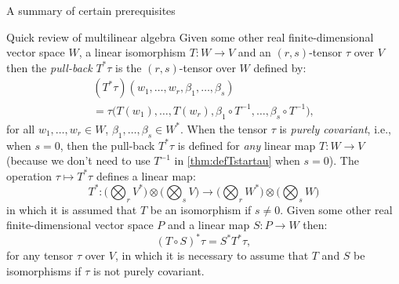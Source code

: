 \documentclass[oneside,a4paper,11pt]{amsbook}
\theoremstyle{remark}\newtheorem{exercise}{Exercise}[chapter]
\theoremstyle{plain}\newtheorem{teo}{Theorem}[section]
\theoremstyle{plain}\newtheorem{lem}[teo]{Lemma}
\theoremstyle{plain}\newtheorem{prop}[teo]{Proposition}
\theoremstyle{plain}\newtheorem{cor}[teo]{Corollary}
\theoremstyle{definition}\newtheorem{defin}[teo]{Definition}
\theoremstyle{remark}\newtheorem{rem}[teo]{Remark}
\theoremstyle{definition}\newtheorem{notation}[teo]{Notation}
\theoremstyle{definition}\newtheorem{convention}[teo]{Convention}
\theoremstyle{definition}\newtheorem{example}[teo]{Example}
\numberwithin{section}{chapter}
\numberwithin{equation}{section}
\begin{document}
\begin{chapter}{A summary of certain prerequisites}
\begin{section}{Quick review of multilinear algebra}
Given some other real finite-dimensional vector space $W$, a linear isomorphism $T:W\to V$ and an $(r,s)$-tensor $\tau$ over $V$ then the {\em pull-back\/}
$T^*\tau$ is the $(r,s)$-tensor over $W$ defined by:
\begin{multline}\label{thm:defTstartau}
(T^*\tau)(w_1,\ldots,w_r,\beta_1,\ldots,\beta_s)\\
=\tau\big(T(w_1),\ldots,T(w_r),\beta_1\circ T^{-1},\ldots,\beta_s\circ T^{-1}\big),
\end{multline}
for all $w_1,\ldots,w_r\in W$, $\beta_1,\ldots,\beta_s\in W^*$. When the tensor $\tau$ is {\em purely covariant},
i.e., when $s=0$, then the pull-back $T^*\tau$ is defined for {\em any\/} linear map $T:W\to V$
(because we don't need to use $T^{-1}$ in \eqref{thm:defTstartau} when $s=0$). The operation $\tau\mapsto T^*\tau$ defines
a linear map:
\[T^*:\Big(\bigotimes_rV^*\Big)\otimes\Big(\bigotimes_sV\Big)\longrightarrow\Big(\bigotimes_rW^*\Big)\otimes\Big(\bigotimes_sW\Big)\]
in which it is assumed that $T$ be an isomorphism if $s\ne0$. Given some other real finite-dimensional vector space $P$ and a linear map $S:P\to W$ then:
\[(T\circ S)^*\tau=S^*T^*\tau,\]
for any tensor $\tau$ over $V$, in which it is necessary to assume that $T$ and $S$ be isomorphisms if $\tau$ is not purely covariant.


\end{section}
\end{chapter}
\end{document}
